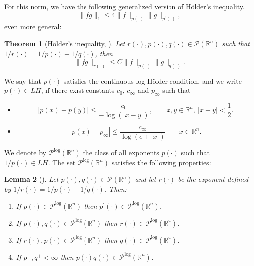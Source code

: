\documentclass[a4paper,11pt,reqno]{amsart}
\theoremstyle{plain}
\numberwithin{equation}{section}
\newtheorem{teo}{Theorem}[section]
\newtheorem{lema}[teo]{Lemma}
\theoremstyle{definition}
\newcommand{\R}{{\mathbb{R}^n}}
\begin{document}
For this norm, we have the following generalized version of Hölder's inequality.
\begin{equation*}
	\|fg\|_1\leq 4\|f\|_{p(\cdot)}\|g\|_{p^\prime(\cdot)},
\end{equation*}
even more general: 
\begin{teo}[Hölder’s inequality, \cite{libro Diening,libro CU-FIO}]\label{teo Hölder}
		Let $r(\cdot),p(\cdot),q(\cdot)\in\mathcal{P}(\R)$ such that $1/r(\cdot)=1/p(\cdot)+1/q(\cdot)$, then
		\begin{equation*}
		\|fg\|_{r(\cdot)}\leq C\|f\|_{p(\cdot)}\|g\|_{q(\cdot)}.
		\end{equation*}
\end{teo}
We say that $p(\cdot)$ satisfies the continuous log-Hölder condition, and we write $p(\cdot)\in LH$, if there exist constants $c_0$, $c_\infty$ and $p_\infty$ such that
\begin{itemize}
    \item
	\begin{equation*}
	|p(x)-p(y)|\leq\frac{c_0}{-\log(|x-y|)},\qquad x,y \in\R,\ |x-y|<\frac{1}{2}.
	\end{equation*} 
	\item
	\begin{equation*}
	|p(x)-p_\infty|\leq\frac{c_\infty}{\log(e+|x|)}\qquad x\in\R.
	\end{equation*}
\end{itemize} 
	We denote by $\mathcal{P}^{\text{log}}(\R)$ the class of all exponents $p(\cdot)$ such that $1/p(\cdot)\in LH$. The set $\mathcal{P}^{\text{log}}(\R)$ satisfies the following properties:
	\begin{lema}[\cite{libro CU-FIO}] \label{algebra de Plog} Let $p(\cdot),q(\cdot)\in\mathcal{P}(\R)$ and let $r(\cdot)$ be the exponent defined by $1/r(\cdot)=1/p(\cdot)+1/q(\cdot)$.  Then:
		\begin{enumerate}
			\item If $p(\cdot)\in \mathcal{P}^{\text{log}}(\R)$ then $p^\prime(\cdot)\in\mathcal{P}^{\text{log}}(\R)$.
			\item If $p(\cdot),q(\cdot)\in \mathcal{P}^{\text{log}}(\R)$ then $r(\cdot)\in\mathcal{P}^{\text{log}}(\R)$.
			\item If $r(\cdot),p(\cdot)\in \mathcal{P}^{\text{log}}(\R)$ then $q(\cdot)\in\mathcal{P}^{\text{log}}(\R)$.
			\item If $p^+,q^+<\infty$ then $p(\cdot)q(\cdot)\in\mathcal{P}^{\text{log}}(\R)$.
		\end{enumerate}	
	\end{lema}
\end{document}
